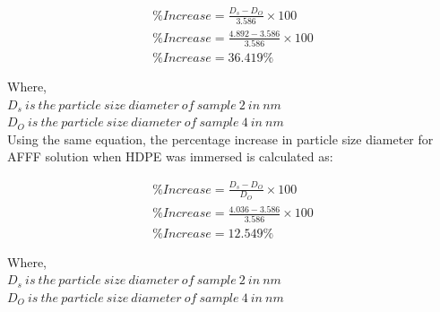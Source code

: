 \documentclass[12pt]{report}
\begin{document}
\begin{gather}
    \%Increase = \frac{D_s - D_O}{3.586} \times 100 \\ 
    \nonumber \%Increase = \frac{4.892 - 3.586}{3.586}\times 100 \\
    \nonumber \%Increase = 36.419\% 
\end{gather}

Where, \\
$D_s\ is\ the\ particle\ size\ diameter\ of\ sample\ 2\ in\ nm$ \\
$D_O\ is\ the\ particle\ size\ diameter\ of\ sample\ 4\ in\ nm$ \\

Using the same equation, the percentage increase in particle size diameter for AFFF solution when HDPE was immersed is calculated as:  

\begin{gather}
    \%Increase = \frac{D_s - D_O}{D_O} \times 100 \\ 
    \nonumber \%Increase = \frac{4.036 - 3.586}{3.586}\times 100 \\
    \nonumber \%Increase = 12.549\% 
\end{gather}
 
Where, \\
$D_s\ is\ the\ particle\ size\ diameter\ of\ sample\ 2\ in\ nm$ \\
$D_O\ is\ the\ particle\ size\ diameter\ of\ sample\ 4\ in\ nm$ \\
\end{document}
